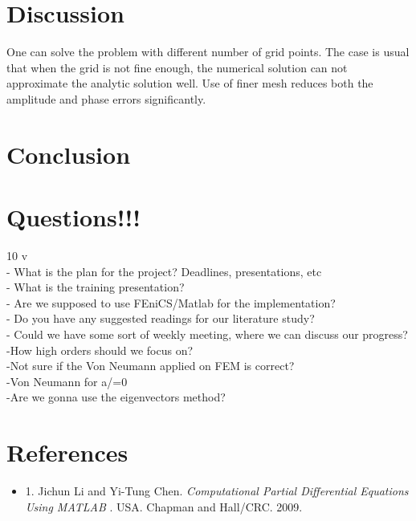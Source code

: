 \documentclass[a4paper,10pt,twoside]{article}
\begin{document}
\section{Discussion}
One can solve the problem with different number of grid points. The case is usual that when the grid is not fine enough, the
numerical solution can not approximate the analytic solution well. Use of
finer mesh reduces both the amplitude and phase errors significantly.





\section{Conclusion}


\section{Questions!!!}
10 v\\
- What is the plan for the project? Deadlines, presentations, etc\\
- What is the training presentation?\\
- Are we supposed to use FEniCS/Matlab for the implementation?\\
- Do you have any suggested readings for our literature study?\\
- Could we have some sort of weekly meeting, where we can discuss our progress?\\


-How high orders should we focus on?\\
-Not sure if the Von Neumann applied on FEM is correct?\\
-Von Neumann for a/=0\\
-Are we gonna use the eigenvectors method?

\begin{comment}
J. D. D. Basabe and M. K. Sen, “Stability of the high-order finite elements for acoustic or elastic wave
propagation with high-order time stepping,” Geophysical Journal International, vol. 181, no. 1, pp. 577–590,
2010.

\end{comment}


\section{References}
\begin{itemize}
    \item 
    1. Jichun Li and Yi-Tung Chen. \textit{Computational Partial
Differential Equations
Using MATLAB }. USA. Chapman and Hall/CRC. 2009. 
\end{itemize}




\end{document}
